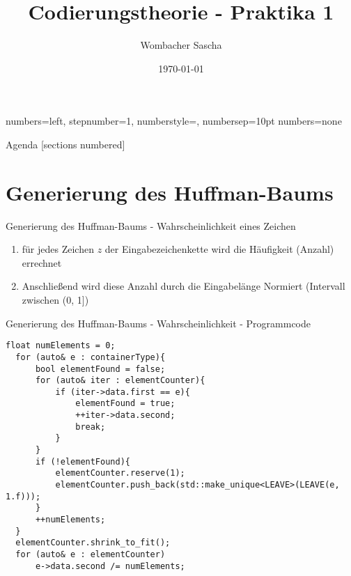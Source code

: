 \documentclass{beamer}
\title{Codierungstheorie - Praktika 1}
\date{\today}
\author{Wombacher Sascha \newline}
\begin{document}
  {numbers=left, stepnumber=1, numberstyle=\tiny, numbersep=10pt}
  {numbers=none}


  \maketitle
  \begin{frame}{Agenda}
    [sections numbered]
    \tableofcontents[hideallsubsections]
  \end{frame}

  \section{Generierung des Huffman-Baums}
  \begin{frame}{Generierung des Huffman-Baums - \newline Wahrscheinlichkeit eines Zeichen}
  	\begin{enumerate}
	  	\item für jedes Zeichen $z$ der Eingabezeichenkette wird die Häufigkeit (Anzahl) errechnet
	  	\item Anschließend wird diese Anzahl durch die Eingabelänge Normiert (Intervall zwischen (0, 1])
	\end{enumerate}
  \end{frame}
  
    \begin{frame}[fragile]{Generierung des Huffman-Baums - \newline Wahrscheinlichkeit - Programmcode}
    	\begin{lstlisting}[style=numbers]
  float numElements = 0;
  for (auto& e : containerType){
      bool elementFound = false;
      for (auto& iter : elementCounter){
          if (iter->data.first == e){
              elementFound = true;
              ++iter->data.second;
              break;
          }
      }
      if (!elementFound){
          elementCounter.reserve(1);
          elementCounter.push_back(std::make_unique<LEAVE>(LEAVE(e, 1.f)));
      }
      ++numElements;
  }
  elementCounter.shrink_to_fit();
  for (auto& e : elementCounter)
      e->data.second /= numElements;
\end{lstlisting}
\end{frame}
    
\end{document}
